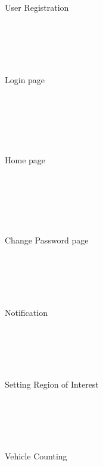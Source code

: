 \\
\begin{figure}[ht]
{}\\
\caption{User Registration}
\end{figure}\\


\\
\begin{figure}[ht]
{}\\
\caption{Login page}
\end{figure}\\

\newpage

\\
\begin{figure}[ht]
{}\\
\caption{Home page}
\end{figure}\\

\newpage

\\
\begin{figure}[ht]
{}\\
\caption{Change Password page}
\end{figure}\\


\\
\begin{figure}[ht]
{}\\
\caption{Notification}
\end{figure}\\


\\
\begin{figure}[ht]
{}\\
\caption{Setting Region of Interest}
\end{figure}\\



\\
\begin{figure}[ht]
{}\\
\caption{Vehicle Counting}
\end{figure}\\[1 cm]




